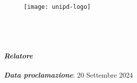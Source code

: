 \begin{titlepage}
    \begin{center}
        \begin{LARGE}
            \textbf{\myUni}\\
        \end{LARGE}

        \vspace{10pt}

        \begin{Large}
            \textsc{\myDepartment}\\
        \end{Large}

        \vspace{10pt}

        \begin{large}
            \textsc{\myFaculty}\\
        \end{large}

        \vspace{30pt}
        \begin{figure}[htbp]
            \centering
            \texttt{[image: unipd-logo]}
        \end{figure}
        \vspace{30pt}

        \begin{large}
            \textsl{\myDegree}\\
        \end{large}

        \begin{LARGE}
            \textbf{\myTitle}\\
        \end{LARGE}

        \vspace{10pt}

        

        \vspace{40pt}

        \begin{large}
            \begin{flushleft}
                \textit{\textbf{Relatore}}\\
                \vspace{5pt}
                \profTitle\ \myProf \\
                \vspace{5pt}
                \textit{\textbf{Data proclamazione}}: 20 Settembre 2024
            \end{flushleft}


\end{large}
\end{center}
\end{titlepage}
